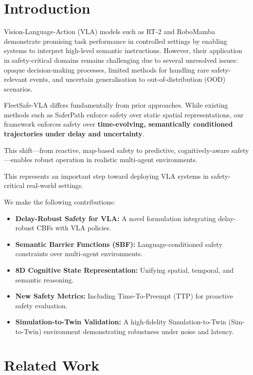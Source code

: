 \documentclass[10pt,twocolumn]{article}
\begin{document}
\section{Introduction}
\label{sec:intro}

Vision-Language-Action (VLA) models such as RT-2 and RoboMamba demonstrate promising task performance in controlled settings by enabling systems to interpret high-level semantic instructions. However, their application in safety-critical domains remains challenging due to several unresolved issues: opaque decision-making processes, limited methods for handling rare safety-relevant events, and uncertain generalisation to out-of-distribution (OOD) scenarios.

FleetSafe-VLA differs fundamentally from prior approaches. While existing methods such as SaferPath enforce safety over static spatial representations, our framework enforces safety over \textbf{time-evolving, semantically conditioned trajectories under delay and uncertainty}.

This shift---from reactive, map-based safety to predictive, cognitively-aware safety---enables robust operation in realistic multi-agent environments.

This represents an important step toward deploying VLA systems in safety-critical real-world settings.

We make the following contributions:
\begin{itemize}
    \item \textbf{Delay-Robust Safety for VLA:} A novel formulation integrating delay-robust CBFs with VLA policies.
    \item \textbf{Semantic Barrier Functions (SBF):} Language-conditioned safety constraints over multi-agent environments.
    \item \textbf{8D Cognitive State Representation:} Unifying spatial, temporal, and semantic reasoning.
    \item \textbf{New Safety Metrics:} Including Time-To-Preempt (TTP) for proactive safety evaluation.
    \item \textbf{Simulation-to-Twin Validation:} A high-fidelity Simulation-to-Twin (Sim-to-Twin) environment demonstrating robustness under noise and latency.
\end{itemize}

\section{Related Work}
\end{document}
